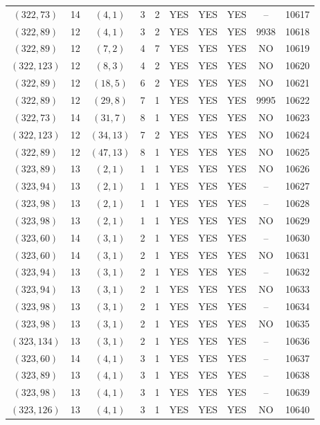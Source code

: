 \begin{longtable}{|c|c|c|c|c|c|c|c|c|c|}
$(322, 73)$ & 14 & $(4, 1)$ & 3 & 2 & YES & YES & YES & -- & 10617\\
$(322, 89)$ & 12 & $(4, 1)$ & 3 & 2 & YES & YES & YES & 9938 & 10618\\
$(322, 89)$ & 12 & $(7, 2)$ & 4 & 7 & YES & YES & YES & NO & 10619\\
$(322, 123)$ & 12 & $(8, 3)$ & 4 & 2 & YES & YES & YES & NO & 10620\\
$(322, 89)$ & 12 & $(18, 5)$ & 6 & 2 & YES & YES & YES & NO & 10621\\
$(322, 89)$ & 12 & $(29, 8)$ & 7 & 1 & YES & YES & YES & 9995 & 10622\\
$(322, 73)$ & 14 & $(31, 7)$ & 8 & 1 & YES & YES & YES & NO & 10623\\
$(322, 123)$ & 12 & $(34, 13)$ & 7 & 2 & YES & YES & YES & NO & 10624\\
$(322, 89)$ & 12 & $(47, 13)$ & 8 & 1 & YES & YES & YES & NO & 10625\\
$(323, 89)$ & 13 & $(2, 1)$ & 1 & 1 & YES & YES & YES & NO & 10626\\
$(323, 94)$ & 13 & $(2, 1)$ & 1 & 1 & YES & YES & YES & -- & 10627\\
$(323, 98)$ & 13 & $(2, 1)$ & 1 & 1 & YES & YES & YES & -- & 10628\\
$(323, 98)$ & 13 & $(2, 1)$ & 1 & 1 & YES & YES & YES & NO & 10629\\
$(323, 60)$ & 14 & $(3, 1)$ & 2 & 1 & YES & YES & YES & -- & 10630\\
$(323, 60)$ & 14 & $(3, 1)$ & 2 & 1 & YES & YES & YES & NO & 10631\\
$(323, 94)$ & 13 & $(3, 1)$ & 2 & 1 & YES & YES & YES & -- & 10632\\
$(323, 94)$ & 13 & $(3, 1)$ & 2 & 1 & YES & YES & YES & NO & 10633\\
$(323, 98)$ & 13 & $(3, 1)$ & 2 & 1 & YES & YES & YES & -- & 10634\\
$(323, 98)$ & 13 & $(3, 1)$ & 2 & 1 & YES & YES & YES & NO & 10635\\
$(323, 134)$ & 13 & $(3, 1)$ & 2 & 1 & YES & YES & YES & -- & 10636\\
$(323, 60)$ & 14 & $(4, 1)$ & 3 & 1 & YES & YES & YES & -- & 10637\\
$(323, 89)$ & 13 & $(4, 1)$ & 3 & 1 & YES & YES & YES & -- & 10638\\
$(323, 98)$ & 13 & $(4, 1)$ & 3 & 1 & YES & YES & YES & -- & 10639\\
$(323, 126)$ & 13 & $(4, 1)$ & 3 & 1 & YES & YES & YES & NO & 10640\\

\end{longtable}
